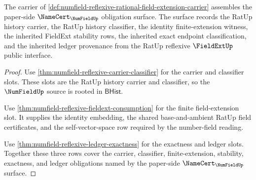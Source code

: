 \begin{theorem}
\label{thm:numfield-reflexive-namecert-obligation-surface}
The carrier of
\autoref{def:numfield-reflexive-rational-field-extension-carrier} assembles the
paper-side $\NameCert_{\NumFieldUp}$ obligation surface. The surface records
the RatUp history carrier, the RatUp history classifier, the identity
finite-extension witness, the inherited FieldExt stability rows, the inherited
exact endpoint classification, and the inherited ledger provenance from the
RatUp reflexive $\FieldExtUp$ public interface.
\end{theorem}
\begin{proof}
Use \autoref{thm:numfield-reflexive-carrier-classifier} for the carrier and
classifier slots. These slots are the RatUp history carrier and classifier, so
the $\NumFieldUp$ source is rooted in $\mathsf{BHist}$.

Use \autoref{thm:numfield-reflexive-fieldext-consumption} for the finite
field-extension slot. It supplies the identity embedding, the shared
base-and-ambient RatUp field certificates, and the self-vector-space row
required by the number-field reading.

Use \autoref{thm:numfield-reflexive-ledger-exactness} for the exactness and
ledger slots. Together these three rows cover the carrier, classifier,
finite-extension, stability, exactness, and ledger obligations named by the
paper-side $\NameCert_{\NumFieldUp}$ surface.
\end{proof}
